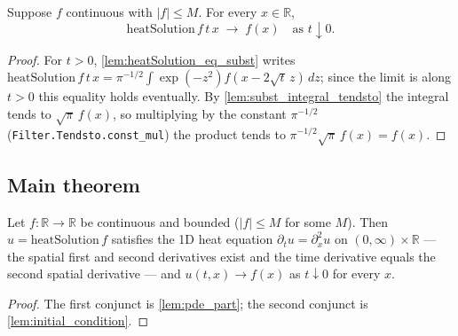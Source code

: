 \begin{lemma}
    \label{lem:initial_condition}
    \leanok
    Suppose $f$ continuous with $\lvert f\rvert \le M$. For every $x \in \mathbb{R}$,
    \[ \mathrm{heatSolution}\,f\,t\,x \;\longrightarrow\; f(x)
       \quad\text{as } t \downarrow 0. \]
\end{lemma}
\begin{proof}
    For $t > 0$, \cref{lem:heatSolution_eq_subst} writes
    $\mathrm{heatSolution}\,f\,t\,x = \pi^{-1/2}\int \exp(-z^2) f(x-2\sqrt{t}\,z)\,dz$;
    since the limit is along $t > 0$ this equality holds eventually. By
    \cref{lem:subst_integral_tendsto} the integral tends to $\sqrt{\pi}\, f(x)$, so
    multiplying by the constant $\pi^{-1/2}$ (\texttt{Filter.Tendsto.const\_mul}) the
    product tends to $\pi^{-1/2}\sqrt{\pi}\,f(x) = f(x)$.
\end{proof}

\subsection{Main theorem}

\begin{theorem}
    \label{thm:heat_kernel_solves_heat_equation}
    \leanok
    Let $f : \mathbb{R} \to \mathbb{R}$ be continuous and bounded ($\lvert f\rvert \le M$
    for some $M$). Then $u = \mathrm{heatSolution}\,f$ satisfies the 1D heat equation
    $\partial_t u = \partial_x^2 u$ on $(0,\infty)\times\mathbb{R}$ — the spatial first
    and second derivatives exist and the time derivative equals the second spatial
    derivative — and $u(t,x) \to f(x)$ as $t \downarrow 0$ for every $x$.
\end{theorem}
\begin{proof}
    The first conjunct is \cref{lem:pde_part}; the second conjunct is
    \cref{lem:initial_condition}.
\end{proof}


